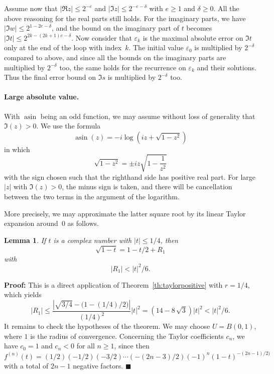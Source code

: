 \documentclass [11pt]{article}
\newcommand {\asin}{\operatorname {asin}}
\renewcommand {\leq}{\leqslant}
\renewcommand {\geq}{\geqslant}
\newtheorem{lemma}[theorem]{Lemma}
\newenvironment{proof}{\noindent \textbf {Proof:}}{{\hspace* {\fill}$\blacksquare$}}
\begin{document}
Assume now that $|\Re z| \leq 2^{-e}$ and $|\Im z| \leq 2^{-e-\delta}$ with
$e \geq 1$ and $\delta \geq 0$. All the above reasoning for the real parts still
holds. For the imaginary parts, we have
$|\Im w| \leq 2^{1-2e-\delta}$, and the bound on the imaginary part of $t$
becomes $|\Im t| \leq 2^{2k-(2k+1)e-\delta}$.
Now consider that $\varepsilon_k$ is the maximal absolute error on
$\Im t$ only at the end of the loop with index~$k$.
The initial value $\varepsilon_0$
is multiplied by $2^{-\delta}$ compared to above,
and since all the bounds on the imaginary
parts are multiplied by $2^{-\delta}$ too, the same holds for the recurrence
on $\varepsilon_k$ and their solutions. Thus the final error bound on
$\Im s$ is multiplied by $2^{-\delta}$ too.


\paragraph {Large absolute value.}
With $\asin$ being an odd function, we may assume without loss of generality
that $\Im (z) > 0$.
We use the formula
\[
\asin (z) = -i \log \left( i z + \sqrt {1-z^2} \right)
\]
in which
\[
\sqrt {1 - z^2} = \pm i z \sqrt {1 - \frac {1}{z^2}}
\]
with the sign chosen such that the righthand side has positive real part.
For large $|z|$ with $\Im (z) > 0$, the minus sign is taken, and there
will be cancellation between the two terms in the argument of the
logarithm.

More precisely, we may approximate the latter square root by its
linear Taylor expansion around~$0$ as follows.

\begin {lemma}
\label {lm:sqrttaylor}
If $t$ is a complex number with $|t| \leq 1/4$, then
\[
\sqrt {1 - t} = 1 - t / 2 + R_1
\]
with
\[
|R_1| < |t|^2 / 6.
\]
\end {lemma}

\begin {proof}
This is a direct application of Theorem~\ref {th:taylorpositive}
with $r = 1 / 4$, which yields
\[
|R_1| \leq \frac {\left| \sqrt {3/4} - \big( 1 - (1/4) / 2 \big) \right|}
                 {(1/4)^2}
           |t|^2
      =    \left( 14 - 8 \, \sqrt {3} \right) |t|^2
      <    |t|^2 / 6.
\]
It remains to check the hypotheses of the theorem.
We may choose $U = B (0, 1)$, where $1$ is the radius of convergence.
Concerning the Taylor coefficients $c_n$, we have $c_0 = 1$ and $c_n < 0$
for all $n \geq 1$, since then
$f^{(n)} (t) = (1/2)(-1/2)(-3/2)\cdots(-(2n-3)/2)
               (-1)^n (1-t)^{-(2n-1)/2)}$
with a total of $2n - 1$ negative factors.
\end {proof}
\end{document}
